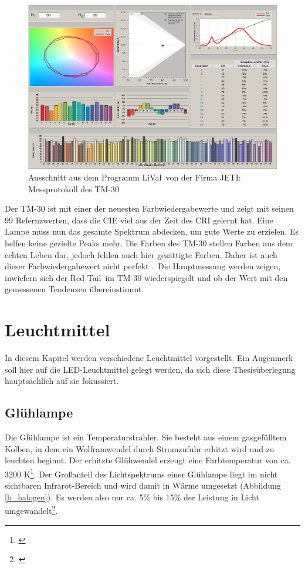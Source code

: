 \begin{figure}[H]     %
\centering
\includegraphics[width=1.0\textwidth]{bilder/tm304} 
\caption {Ausschnitt aus dem Programm \glqq LiVal\grqq\ von der Firma JETI: Messprotokoll des TM-30}\label{b_tm304}
\end{figure}


\noindent Der TM-30 ist mit einer der neuesten Farbwiedergabewerte und zeigt mit seinen 99 Refernzwerten, dass die CIE viel aus der Zeit des CRI gelernt hat. Eine Lampe muss nun das gesamte Spektrum abdecken, um gute Werte zu erzielen. Es helfen keine gezielte Peaks mehr. Die Farben des TM-30 stellen Farben aus dem echten Leben dar, jedoch fehlen auch hier gesättigte Farben. Daher ist auch dieser Farbwiedergabewert nicht \glqq perfekt\grqq\ . Die Hauptmessung werden zeigen, inwiefern sich der \glqq Red Tail\grqq\ im TM-30 wiederspiegelt und ob der Wert mit den gemessenen Tendenzen übereinstimmt.

\chapter{Leuchtmittel}\label{chap_leuchtmittel}
In diesem Kapitel werden verschiedene Leuchtmittel vorgestellt. Ein Augenmerk soll hier auf die LED-Leuchtmittel gelegt werden, da sich diese Thesisüberlegung hauptsächlich auf sie fokussiert.


\section{Glühlampe} \label{sec_glühlampe}
Die Glühlampe ist ein Temperaturstrahler. Sie besteht aus einem gasgefülltem Kolben, in dem ein Wolframwendel durch Stromzufuhr erhitzt wird und zu leuchten beginnt. Der erhitzte Glühwendel erzeugt eine Farbtemperatur von ca. 3200 K\footnote{\cite[137]{mueller}}. Der Großanteil des Lichtspektrums einer Glühlampe liegt im nicht sichtbaren Infrarot-Bereich und wird damit in Wärme umgesetzt (Abbildung \ref{b_halogen}). Es werden also nur ca. 5\% bis 15\% der Leistung in Licht umgewandelt\footnote{\cite[78]{ris}}.

